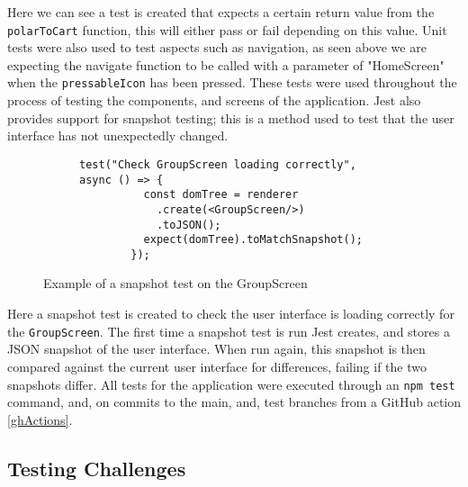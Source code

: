 Here we can see a test is created that expects a certain return value from the \texttt{polarToCart} function, this will either pass or fail depending on this value. Unit tests were also used to test aspects such as navigation, as seen above we are expecting the navigate function to be called with a parameter of "HomeScreen" when the \texttt{pressableIcon} has been pressed. These tests were used throughout the process of testing the components, and screens of the application. Jest also provides support for snapshot testing; this is a method used to test that the user interface has not unexpectedly changed. 

\begin{figure}[!htbp]
    \centering
    \begin{subfigure}[b]{0.8\textwidth}
        \begin{lstlisting}[language=jsJsx]
        test("Check GroupScreen loading correctly", async () => {
          const domTree = renderer
            .create(<GroupScreen/>)
            .toJSON();
          expect(domTree).toMatchSnapshot();
        });
        \end{lstlisting}
    \end{subfigure}
\caption{Example of a snapshot test on the GroupScreen}
\label{fig:jestSnap}
\end{figure}
\FloatBarrier

Here a snapshot test is created to check the user interface is loading correctly for the \texttt{GroupScreen}. The first time a snapshot test is run Jest creates, and stores a JSON snapshot of the user interface. When run again, this snapshot is then compared against the current user interface for differences, failing if the two snapshots differ. All tests for the application were executed through an \texttt{npm test} command, and, on commits to the main, and, test branches from a GitHub action \ref{ghActions}.

\subsection{Testing Challenges}\label{testChall}

